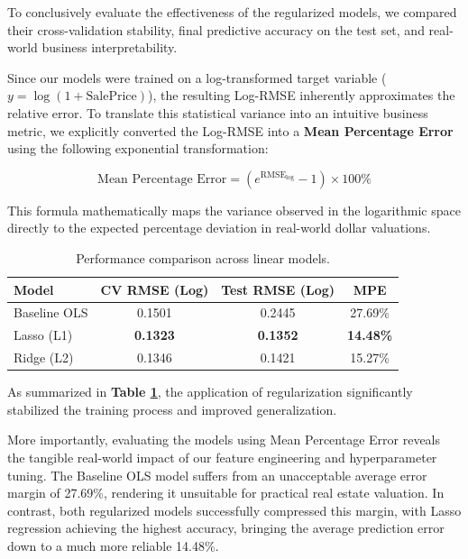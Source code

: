 \documentclass[11pt]{article}
\begin{document}
To conclusively evaluate the effectiveness of the regularized models, we compared their cross-validation stability, final predictive accuracy on the test set, and real-world business interpretability. 

\vspace{0.5em}
\noindent Since our models were trained on a log-transformed target variable ($y = \log(1 + \text{SalePrice})$), the resulting Log-RMSE inherently approximates the relative error. To translate this statistical variance into an intuitive business metric, we explicitly converted the Log-RMSE into a \textbf{Mean Percentage Error} using the following exponential transformation:

\begin{equation}
    \text{Mean Percentage Error} = \left( e^{\text{RMSE}_{\text{log}}} - 1 \right) \times 100\%
\end{equation}

\noindent This formula mathematically maps the variance observed in the logarithmic space directly to the expected percentage deviation in real-world dollar valuations.

\begin{table}[H]
    \centering
    \renewcommand{\arraystretch}{1.2}
    \begin{tabular}{lccc}
        \toprule
        \textbf{Model} & \textbf{CV RMSE (Log)} & \textbf{Test RMSE (Log)} & \textbf{MPE} \\
        \midrule
        Baseline OLS & 0.1501 & 0.2445 & 27.69\% \\
        Lasso (L1)   & \textbf{0.1323} & \textbf{0.1352} & \textbf{14.48\%} \\
        Ridge (L2)   & 0.1346 & 0.1421 & 15.27\% \\
        \bottomrule
    \end{tabular}
    \caption{Performance comparison across linear models.}
    \label{tab:model_comparison}
\end{table}

\noindent As summarized in \textbf{Table \ref{tab:model_comparison}}, the application of regularization significantly stabilized the training process and improved generalization. 

\vspace{0.5em}
\noindent More importantly, evaluating the models using Mean Percentage Error reveals the tangible real-world impact of our feature engineering and hyperparameter tuning. The Baseline OLS model suffers from an unacceptable average error margin of 27.69\%, rendering it unsuitable for practical real estate valuation. In contrast, both regularized models successfully compressed this margin, with Lasso regression achieving the highest accuracy, bringing the average prediction error down to a much more reliable 14.48\%.
\end{document}
